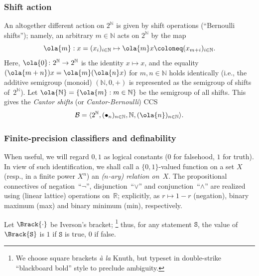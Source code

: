 \subsubsection{Shift action}\label{sec:shifts}
An altogether different action on $2^{\mathbb{N}}$ is given by shift operations (“Bernoulli shifts”);
namely, an arbitrary $m\in \mathbb{N}$ acts on $2^{\mathbb{N}}$ by the map
\begin{equation*}
    \ola{m} : x = (x_i)_{i\in \mathbb{N}}\mapsto \ola{m}x
    \coloneq (x_{m+i})_{i\in \mathbb{N}}.
\end{equation*}
Here, $\ola{0}\colon 2^{\mathbb{N}}\to2^{\mathbb{N}}$ is the identity $x\mapsto x$, and the equality $(\ola{m+n})x = \ola{m}(\ola{n}x)$ for $m,n\in \mathbb{N}$ holds identically (i.e., the additive semigroup (monoid) $(\mathbb{N},0,+)$ is represented as the semigroup of shifts of~$2^{\mathbb{N}}$).
Let $\ola{\mathbb{N}} = \{\ola{m}: m\in \mathbb{N}\}$ be the semigroup of all shifts.
This gives the \emph{Cantor shifts} (or \emph{Cantor-Bernoulli}) CCS
\begin{equation*}
    \mathcal{B} = \langle2^{\mathbb{N}}, (\bullet_n)_{n\in \mathbb{N}}, \mathbb{N}, (\ola{n})_{n\in\mathbb{N}}\rangle.
\end{equation*}

\subsubsection{Finite-precision classifiers and definability}\label{sec:fin-prec-class-defin}
\begin{notation}
    When useful, we will regard $0, 1$ as logical constants ($0$ for falsehood, $1$ for truth).
    In view of such identification, we shall call a $\{0,1\}$-valued function on a set $X$ (resp., in a finite power $X^n$) an \emph{($n$-ary) relation on~$X$}.
    The propositional connectives of negation~“$\neg$”, disjunction~“$\vee$” and conjunction~“$\wedge$” are realized using (linear lattice) operations on~$\mathbb{R}$; explicitly, as $r\mapsto 1-r$ (negation), binary maximum (max) and binary minimum (min), respectively.

    Let $\Brack{\cdot}$ be Iverson's bracket; \footnote{We choose square brackets \emph{à la} Knuth, but typeset in double-strike “blackboard bold” style to preclude ambiguity.} thus, for any statement $\mathtt{S}$, the value of $\Brack{\mathtt{S}}$ is $1$ if $\mathtt{S}$ is true, $0$ if false.
\end{notation}

